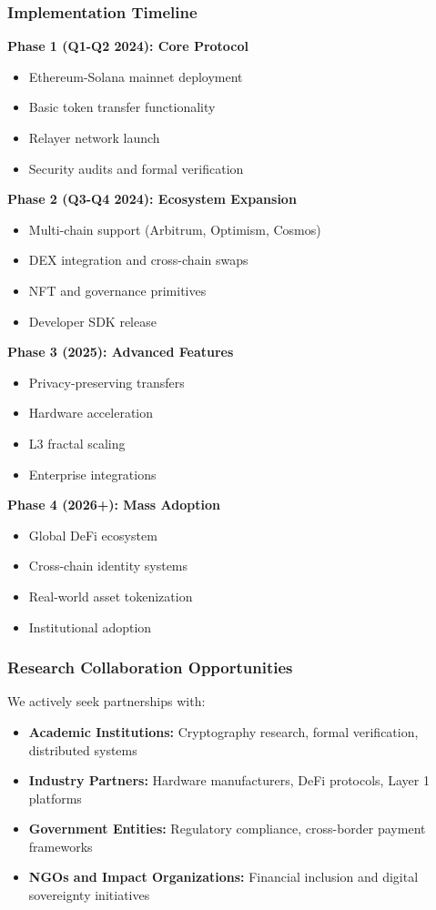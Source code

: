 \documentclass[11pt,a4paper]{article}
\begin{document}
\subsubsection{Implementation Timeline}

\textbf{Phase 1 (Q1-Q2 2024): Core Protocol}
\begin{itemize}
    \item Ethereum-Solana mainnet deployment
    \item Basic token transfer functionality
    \item Relayer network launch
    \item Security audits and formal verification
\end{itemize}

\textbf{Phase 2 (Q3-Q4 2024): Ecosystem Expansion}
\begin{itemize}
    \item Multi-chain support (Arbitrum, Optimism, Cosmos)
    \item DEX integration and cross-chain swaps
    \item NFT and governance primitives
    \item Developer SDK release
\end{itemize}

\textbf{Phase 3 (2025): Advanced Features}
\begin{itemize}
    \item Privacy-preserving transfers
    \item Hardware acceleration
    \item L3 fractal scaling
    \item Enterprise integrations
\end{itemize}

\textbf{Phase 4 (2026+): Mass Adoption}
\begin{itemize}
    \item Global DeFi ecosystem
    \item Cross-chain identity systems
    \item Real-world asset tokenization
    \item Institutional adoption
\end{itemize}

\subsubsection{Research Collaboration Opportunities}

We actively seek partnerships with:
\begin{itemize}
    \item \textbf{Academic Institutions:} Cryptography research, formal verification, distributed systems
    \item \textbf{Industry Partners:} Hardware manufacturers, DeFi protocols, Layer 1 platforms
    \item \textbf{Government Entities:} Regulatory compliance, cross-border payment frameworks
    \item \textbf{NGOs and Impact Organizations:} Financial inclusion and digital sovereignty initiatives
\end{itemize}
\end{document}
